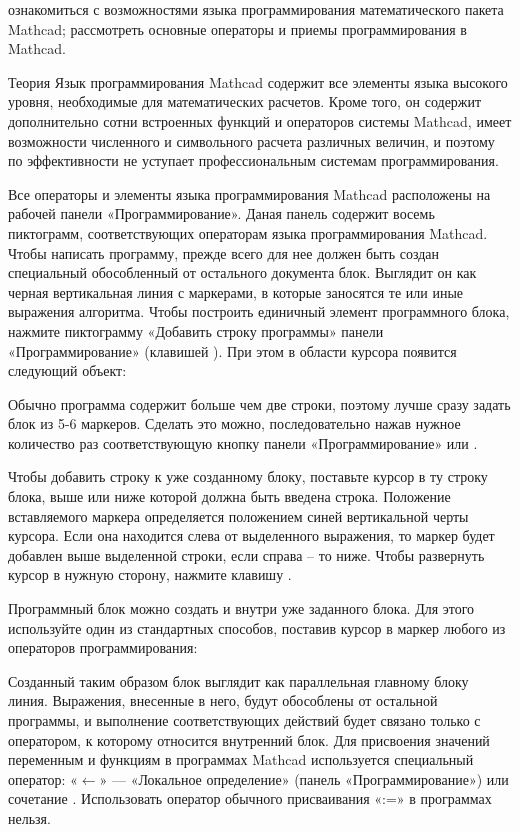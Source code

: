 
\goal ознакомиться с возможностями языка программирования математического пакета Mathcad; рассмотреть основные операторы и приемы программирования в Mathcad.

Теория
Язык программирования Mathcad содержит все элементы языка высокого уровня, необходимые для математических расчетов. Кроме того, он содержит дополнительно сотни встроенных функций и операторов системы Mathcad, имеет возможности численного и символьного расчета различных величин, и поэтому по эффективности не уступает профессиональным системам программирования.

Все операторы и элементы языка программирования Mathcad расположены на рабочей панели «Программирование». Даная панель содержит восемь пиктограмм, соответствующих операторам языка программирования Mathcad. 
Чтобы написать программу, прежде всего для нее должен быть создан специальный обособленный от остального документа блок. Выглядит он как черная вертикальная линия с маркерами, в которые заносятся те или иные выражения алгоритма. Чтобы построить единичный элемент программного блока, нажмите пиктограмму «Добавить строку программы» панели «Программирование» (клавишей \keys{]}). При этом в области курсора появится следующий объект:

Обычно программа содержит больше чем две строки, поэтому лучше сразу задать блок из 5-6 маркеров. Сделать это можно, последовательно нажав нужное количество раз соответствующую кнопку панели «Программирование» или \keys{]}.

Чтобы добавить строку к уже созданному блоку, поставьте курсор в ту строку блока, выше или ниже которой должна быть введена строка. Положение вставляемого маркера определяется положением синей вертикальной черты курсора. Если она находится слева от выделенного выражения, то маркер будет добавлен выше выделенной строки, если справа – то ниже. Чтобы развернуть курсор в нужную сторону, нажмите клавишу .

Программный блок можно создать и внутри уже заданного блока. Для этого используйте один из стандартных способов, поставив курсор в маркер любого из операторов программирования:

Созданный таким образом блок выглядит как параллельная главному блоку линия. Выражения, внесенные в него, будут обособлены от остальной программы, и выполнение соответствующих действий будет связано только с оператором, к которому относится внутренний блок.
Для присвоения значений переменным и функциям в программах Mathcad используется специальный оператор: «$\leftarrow$» --- «Локальное определение» (панель «Программирование») или сочетание \keys{\shift + [} . Использовать оператор обычного присваивания «:=» в программах нельзя.

